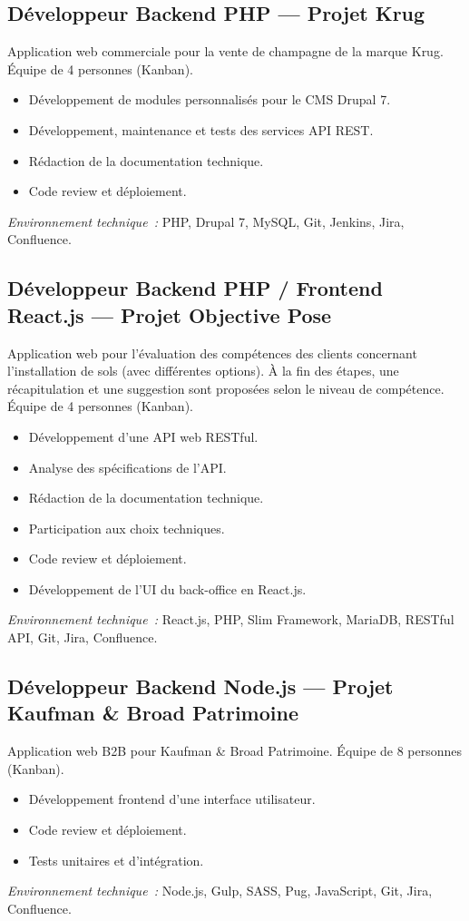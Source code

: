 \documentclass[10pt,a4paper]{article}
\begin{document}
\subsection*{Développeur Backend PHP --- Projet Krug}
\color{darkgray}
Application web commerciale pour la vente de champagne de la marque Krug. Équipe de 4 personnes (Kanban).
\begin{itemize}
  \item Développement de modules personnalisés pour le CMS Drupal 7.
  \item Développement, maintenance et tests des services API REST.
  \item Rédaction de la documentation technique.
  \item Code review et déploiement.
\end{itemize}
\textit{Environnement technique~:} PHP, Drupal 7, MySQL, Git, Jenkins, Jira, Confluence.

\vspace{6pt}

\subsection*{Développeur Backend PHP / Frontend React.js --- Projet Objective Pose}
\color{darkgray}
Application web pour l'évaluation des compétences des clients concernant l'installation de sols (avec différentes options). À la fin des étapes, une récapitulation et une suggestion sont proposées selon le niveau de compétence. Équipe de 4 personnes (Kanban).
\begin{itemize}
  \item Développement d'une API web RESTful.
  \item Analyse des spécifications de l'API.
  \item Rédaction de la documentation technique.
  \item Participation aux choix techniques.
  \item Code review et déploiement.
  \item Développement de l'UI du back-office en React.js.
\end{itemize}
\textit{Environnement technique~:} React.js, PHP, Slim Framework, MariaDB, RESTful API, Git, Jira, Confluence.

\vspace{6pt}

\subsection*{Développeur Backend Node.js --- Projet Kaufman \& Broad Patrimoine}
\color{darkgray}
Application web B2B pour Kaufman \& Broad Patrimoine. Équipe de 8 personnes (Kanban).
\begin{itemize}
  \item Développement frontend d'une interface utilisateur.
  \item Code review et déploiement.
  \item Tests unitaires et d'intégration.
\end{itemize}
\textit{Environnement technique~:} Node.js, Gulp, SASS, Pug, JavaScript, Git, Jira, Confluence.
\end{document}
